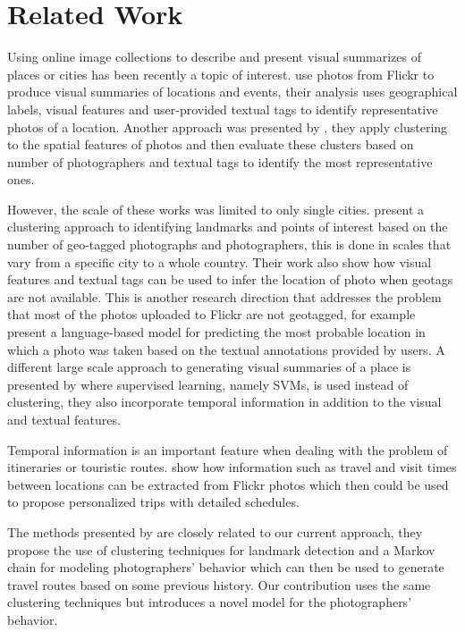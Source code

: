 \chapter{Related Work}
\label{sec:related_work}

Using online image collections to describe and present visual summarizes of places or cities has been recently a topic of interest. \citet{Kennedy2007, Kennedy2008} use photos from Flickr to produce visual summaries of locations and events, their analysis uses geographical labels, visual features and user-provided textual tags to identify representative photos of a location. Another approach was presented by \cite{Jaffe2006}, they apply clustering to the spatial features of photos and then evaluate these clusters based on number of photographers and textual tags to identify the most representative ones.

However, the scale of these works was limited to only single cities. \cite{Kleinberg2009} present a clustering approach to identifying landmarks and points of interest based on the number of geo-tagged photographs and photographers, this is done in scales that vary from a specific city to a whole country. Their work also show how visual features and textual tags can be used to infer the location of photo when geotags are not available. This is another research direction that addresses the problem that most of the photos uploaded to Flickr are not geotagged, for example \citet{Serdyukov2009} present a language-based model for predicting the most probable location in which a photo was taken based on the textual annotations provided by users. A different large scale approach to generating visual summaries of a place is presented by \citet{Li2009} where supervised learning, namely SVMs, is used instead of clustering, they also incorporate temporal information in addition to the visual and textual features.

Temporal information is an important feature when dealing with the problem of itineraries or touristic routes. \citet{Popescu2009} show how information such as travel and visit times between locations can be extracted from Flickr photos which then could be used to propose personalized trips with detailed schedules.

The methods presented by \cite{Kurashima2010} are closely related to our current approach, they propose the use of clustering techniques for landmark detection and a Markov chain for modeling photographers' behavior which can then be used to generate travel routes based on some previous history. Our contribution uses the same clustering techniques but introduces a novel model for the photographers' behavior.


